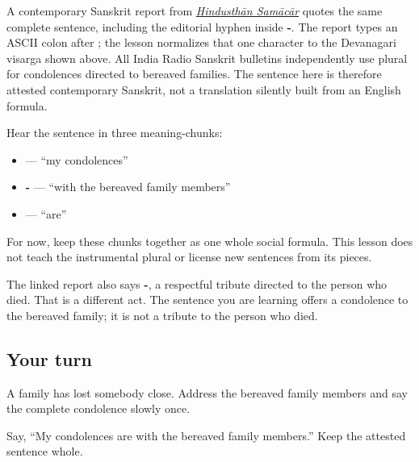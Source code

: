 A contemporary Sanskrit report from \href{https://sanskrit.hindusthansamachar.in/Encyc/2026/5/28/Chief-Minister-Expresses-Grief-Demise-Poet-Dr-Bash.php}{\emph{Hindusthān Samācār}} quotes the same complete sentence, including the editorial hyphen inside \textbf{-}. The report types an ASCII colon after \textbf{}; the lesson normalizes that one character to the Devanagari visarga \textbf{} shown above. All India Radio Sanskrit bulletins independently use plural \textbf{} for condolences directed to bereaved families. The sentence here is therefore attested contemporary Sanskrit, not a translation silently built from an English formula.

\begin{grammarlens}[title={Grammar Lens: keep the formula whole}]
Hear the sentence in three meaning-chunks:

\begin{itemize}
\raggedright
  \item \textbf{ } — “my condolences”
  \item \textbf{- } — “with the bereaved family members”
  \item \textbf{} — “are”
\end{itemize}

For now, keep these chunks together as one whole social formula. This lesson does not teach the instrumental plural or license new sentences from its pieces.

The linked report also says \textbf{ -}, a respectful tribute directed to the person who died. That is a different act. The sentence you are learning offers a condolence to the bereaved family; it is not a tribute to the person who died.
\end{grammarlens}

\subsection*{Your turn}
A family has lost somebody close. Address the bereaved family members and say the complete condolence slowly once.

\begin{tcolorbox}[breakable,colback=teal!4,colframe=teal!35!black,title={Before you move on}]
Say, “My condolences are with the bereaved family members.” Keep the attested sentence whole.
\end{tcolorbox}
